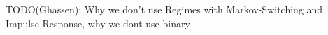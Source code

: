 TODO(Ghassen): Why we don't use Regimes with Markov-Switching and Impulse Response, why we dont use binary
